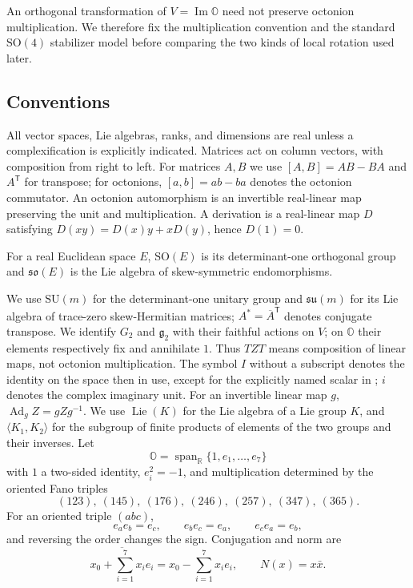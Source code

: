 \documentclass[11pt,a4paper]{article}
\newcommand{\RR}{\mathbb R}
\newcommand{\OO}{\mathbb O}
\newcommand{\SO}{\mathrm{SO}}
\newcommand{\SU}{\mathrm{SU}}
\newcommand{\Lie}{\operatorname{Lie}}
\newcommand{\Span}{\operatorname{span}}
\begin{document}
An orthogonal transformation of $V=\operatorname{Im}\OO$ need not preserve octonion multiplication.  We therefore fix the multiplication convention and the standard $\SO(4)$ stabilizer model before comparing the two kinds of local rotation used later.

\subsection{Conventions}

All vector spaces, Lie algebras, ranks, and dimensions are real unless a complexification is explicitly indicated.  Matrices act on column vectors, with composition from right to left.  For matrices $A,B$ we use $[A,B]=AB-BA$ and $A^{\mathsf T}$ for transpose; for octonions, $[a,b]=ab-ba$ denotes the octonion commutator.  An octonion automorphism is an invertible real-linear map preserving the unit and multiplication.  A derivation is a real-linear map $D$ satisfying $D(xy)=D(x)y+xD(y)$, hence $D(1)=0$.

For a real Euclidean space $E$, $\SO(E)$ is its determinant-one orthogonal group and $\mathfrak{so}(E)$ is the Lie algebra of skew-symmetric endomorphisms.

We use $\SU(m)$ for the determinant-one unitary group and $\mathfrak{su}(m)$ for its Lie algebra of trace-zero skew-Hermitian matrices; $A^*=\overline A^{\mathsf T}$ denotes conjugate transpose.  We identify $G_2$ and $\mathfrak g_2$ with their faithful actions on $V$; on $\OO$ their elements respectively fix and annihilate $1$.  Thus $TZT$ means composition of linear maps, not octonion multiplication.  The symbol $I$ without a subscript denotes the identity on the space then in use, except for the explicitly named scalar in ; $i$ denotes the complex imaginary unit.  For an invertible linear map $g$, $\operatorname{Ad}_g Z=gZg^{-1}$.  We use $\Lie(K)$ for the Lie algebra of a Lie group $K$, and $\langle K_1,K_2\rangle$ for the subgroup of finite products of elements of the two groups and their inverses.
Let
\[
\OO=\Span_{\RR}\{1,e_1,\ldots,e_7\}
\]
with $1$ a two-sided identity, $e_i^2=-1$, and multiplication determined by the oriented Fano triples
\begin{equation}
(123),\ (145),\ (176),\ (246),\ (257),\ (347),\ (365).
\label{eq:fano}
\end{equation}
For an oriented triple $(abc)$,
\[
e_ae_b=e_c,\qquad e_be_c=e_a,\qquad e_ce_a=e_b,
\]
and reversing the order changes the sign.  Conjugation and norm are
\[
\overline{x_0+\sum_{i=1}^7x_ie_i}=x_0-\sum_{i=1}^7x_ie_i,
\qquad
N(x)=x\bar x.
\]
\end{document}
